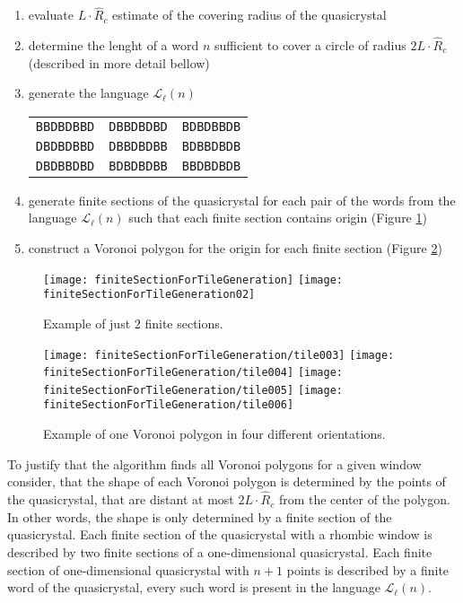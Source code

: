 \documentclass[text.tex]{subfiles}
\begin{document}
\begin{enumerate}
\item evaluate $L\cdot\hat{R}_c$ estimate of the covering radius of the quasicrystal
\item determine the lenght of a word $n$ sufficient to cover a circle of radius $2L\cdot\hat{R}_c$ (described in more detail bellow)
\item generate the language $\mathcal{L}_{\ell}(n)$

\begin{tabular}{ccc}
\texttt{BBDBDBBD} & \texttt{DBBDBDBD} & \texttt{BDBDBBDB} \\
\texttt{DBDBDBBD} & \texttt{DBBDBDBB} & \texttt{BDBBDBDB} \\
\texttt{DBDBBDBD} & \texttt{BDBDBDBB} & \texttt{BBDBDBDB} \\
\end{tabular}
\item generate finite sections of the quasicrystal for each pair of the words from the language $\mathcal{L}_{\ell}(n)$ such that each finite section contains origin (Figure \ref{fig:finiteSectionForTileGeneration})
\item construct a Voronoi polygon for the origin for each finite section (Figure \ref{fig:finiteSectionForTileGeneration:more})
\end{enumerate}

\begin{figure}[h]
\centering
\texttt{[image: finiteSectionForTileGeneration]}
\texttt{[image: finiteSectionForTileGeneration02]}
\caption{Example of just $2$ finite sections.}
\label{fig:finiteSectionForTileGeneration}
\end{figure}

\begin{figure}[h]
\centering
\texttt{[image: finiteSectionForTileGeneration/tile003]}
\texttt{[image: finiteSectionForTileGeneration/tile004]}
\texttt{[image: finiteSectionForTileGeneration/tile005]}
\texttt{[image: finiteSectionForTileGeneration/tile006]}
\caption{Example of one Voronoi polygon in four different orientations.}
\label{fig:finiteSectionForTileGeneration:more}
\end{figure}

To justify that the algorithm finds all Voronoi polygons for a given window consider, that the shape of each Voronoi polygon is determined by the points of the quasicrystal, that are distant at most $2L\cdot\hat{R}_c$ from the center of the polygon. In other words, the shape is only determined by a finite section of the quasicrystal. Each finite section of the quasicrystal with a rhombic window is described by two finite sections of a one-dimensional quasicrystal. Each finite section of one-dimensional quasicrystal with $n+1$ points is described by a finite word of the quasicrystal, every such word is present in the language $\mathcal{L}_{\ell}(n)$.
\end{document}
